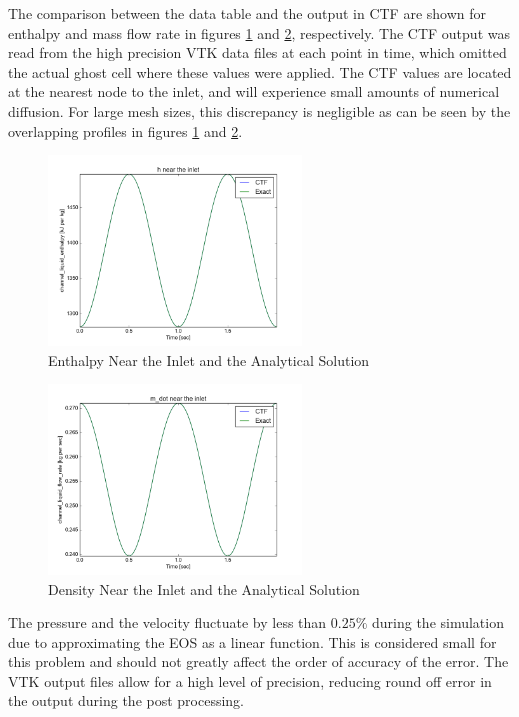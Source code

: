 \documentclass{mc2015}
\begin{document}
The comparison between the data table and the output in CTF are shown for
enthalpy and mass flow rate in figures \ref{fig:Inlet_h} and
\ref{fig:Inlet_m_dot}, respectively. The CTF output was read from the high
precision VTK data files at each point in time, which omitted the actual ghost
cell where these values were applied. The CTF values are located at the nearest
node to the inlet, and will experience small amounts of numerical diffusion. For
large mesh sizes, this discrepancy is negligible as can be seen by the
overlapping profiles in figures \ref{fig:Inlet_h} and \ref{fig:Inlet_m_dot}.

\begin{figure}[!h]
	\centering
	\includegraphics[width=0.60\textwidth]{images/Code_Verification/run_00_00/residual/results/Inlet_h}
	\caption{Enthalpy Near the Inlet and the Analytical Solution}
	\label{fig:Inlet_h}
\end{figure}

\begin{figure}[!h]
	\centering
	\includegraphics[width=0.60\textwidth]{images/Code_Verification/run_00_00/residual/results/Inlet_m_dot}
	\caption{Density Near the Inlet and the Analytical Solution}
	\label{fig:Inlet_m_dot}
\end{figure}

 The pressure and the velocity fluctuate by less than $0.25\%$ during the
 simulation due to approximating the EOS as a linear function. This is considered small for
 this problem and should not greatly affect the order of accuracy of the error. 
 The VTK output files allow for a high level of precision, reducing
 round off error in the output during the post processing.
\end{document}
